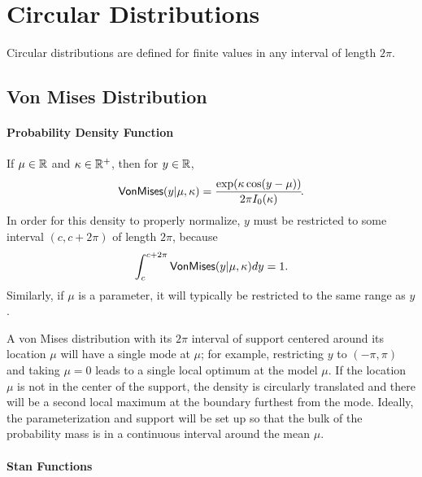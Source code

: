 \chapter{Circular Distributions}

\noindent
Circular distributions are defined for finite values  in any
interval of length $2\pi$.


\section{Von Mises Distribution}

\subsubsection{Probability Density Function}

If $\mu \in \mathbb{R}$ and $\kappa \in \mathbb{R}^+$, then for $y \in
\mathbb{R}$,
%
\[
\mbox{\sf VonMises}(y|\mu,\kappa)
=
\frac{\exp(\kappa\cos(y-\mu))}{2\pi I_0(\kappa)}
\!.
\]
%
In order for this density to properly normalize, $y$ must be
restricted to some interval  $(c, c + 2\pi)$ of length $2 \pi$,
because
%
\[
\int_{c}^{c + 2\pi} \mbox{\sf VonMises}(y|\mu,\kappa) dy
= 1.
\]
%
Similarly, if $\mu$ is a parameter, it will typically be restricted to
the same range as $y$.

A von Mises distribution with its $2 \pi$ interval of support centered
around its location $\mu$ will have a single mode at $\mu$; for
example, restricting $y$ to $(-\pi,\pi)$ and taking $\mu = 0$ leads to
a single local optimum at the model $\mu$.  If the location $\mu$ is
not in the center of the support, the density is circularly translated
and there will be a second local maximum at the boundary furthest from
the mode.  Ideally, the parameterization and support will be set up so
that the bulk of the probability mass is in a continuous interval
around the mean $\mu$.


\subsubsection{Stan Functions}

\begin{description}
\end{description}

